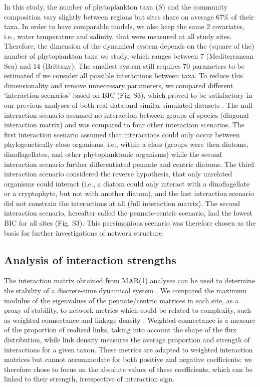 \documentclass[10pt]{article}
\begin{document}
In this study, the number of phytoplankton taxa ($S$) and the community
composition vary slightly between regions but sites share on average
67\% of their taxa. In order to have comparable models, we also keep
the same 2 covariates, i.e., water temperature and salinity, that
were measured at all study sites. Therefore, the dimension of the
dynamical system depends on the (square of the) number of phytoplankton
taxa we study, which ranges between 7 (Mediterranean Sea) and 14 (Brittany).
The smallest system still requires 70 parameters to be estimated if
we consider all possible interactions between taxa. To reduce this
dimensionality and remove unnecessary parameters, we compared different
`interaction scenarios' based on BIC (Fig~S3), which proved to be
satisfactory in our previous analyses of both real data and similar
simulated datasets \citep{barraquand_coastal_2018}. The null interaction
scenario assumed no interaction between groups of species (diagonal
interaction matrix) and was compared to four other interaction scenarios.
The first interaction scenario assumed that interactions could only
occur between phylogenetically close organisms, i.e., within a class
(groups were then diatoms, dinoflagellates, and other phytoplanktonic
organisms) while the second interaction scenario further differentiated
pennate and centric diatoms. The third interaction scenario considered
the reverse hypothesis, that only unrelated organisms could interact
(i.e., a diatom could only interact with a dinoflagellate or a cryptophyte,
but not with another diatom), and the last interaction scenario did
not constrain the interactions at all (full interaction matrix). The
second interaction scenario, hereafter called the pennate-centric
scenario, had the lowest BIC for all sites (Fig. S3). This parsimonious
scenario was therefore chosen as the basis for further investigations
of network structure.

\subsection*{Analysis of interaction strengths}

The interaction matrix obtained from MAR(1) analyses can be used to
determine the stability of a discrete-time dynamical system \citep{ives_estimating_2003}.
We compared the maximum modulus of the eigenvalues of the pennate/centric
matrices in each site, as a proxy of stability, to network metrics
which could be related to complexity, such as weighted connectance
and linkage density \citep{bersier_quantitative_2002}. Weighted connectance
is a measure of the proportion of realized links, taking into account
the shape of the flux distribution, while link density measures the
average proportion and strength of interactions for a given taxon.
These metrics are adapted to weighted interaction matrices but cannot
accommodate for both positive and negative coefficients: we therefore
chose to focus on the absolute values of these coefficients, which
can be linked to their strength, irrespective of interaction sign.
\end{document}
